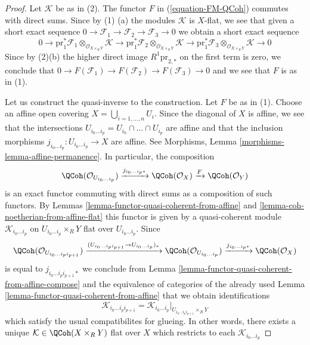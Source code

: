 \begin{proof}
Let $\mathcal{K}$ be as in (2). The functor $F$ in
(\ref{equation-FM-QCoh}) commutes with direct sums.
Since by (1) (a) the modules $\mathcal{K}$ is $X$-flat,
we see that given a short exact
sequence $0 \to \mathcal{F}_1 \to \mathcal{F}_2 \to \mathcal{F}_3 \to 0$
we obtain a short exact sequence
$$
0 \to
\text{pr}_1^*\mathcal{F}_1 \otimes_{\mathcal{O}_{X \times_R Y}} \mathcal{K} \to
\text{pr}_1^*\mathcal{F}_2 \otimes_{\mathcal{O}_{X \times_R Y}} \mathcal{K} \to
\text{pr}_1^*\mathcal{F}_3 \otimes_{\mathcal{O}_{X \times_R Y}} \mathcal{K} \to
0
$$
Since by (2)(b) the higher direct image $R^1\text{pr}_{2, *}$
on the first term is zero, we conclude that
$0 \to F(\mathcal{F}_1) \to F(\mathcal{F}_2) \to F(\mathcal{F}_3) \to 0$
and we see that $F$ is as in (1).

\medskip\noindent
Let us construct the quasi-inverse to the construction. Let $F$ be
as in (1). Choose an affine open covering $X = \bigcup_{i = 1, \ldots, n} U_i$.
Since the diagonal of $X$ is affine, we see that the intersections
$U_{i_0 \ldots i_p} = U_{i_0} \cap \ldots \cap U_{i_p}$ are affine
and that the inclusion morphisms
$j_{i_0 \ldots i_p} : U_{i_0 \ldots i_p} \to X$
are affine. See Morphisms, Lemma \ref{morphisms-lemma-affine-permanence}.
In particular, the composition
$$
\QCoh(\mathcal{O}_{U_{i_0 \ldots i_p}})
\xrightarrow{j_{i_0 \ldots i_p *}}
\QCoh(\mathcal{O}_X) \xrightarrow{F}
\QCoh(\mathcal{O}_Y)
$$
is an exact functor commuting with direct sums as a composition of such
functors. By Lemmas \ref{lemma-functor-quasi-coherent-from-affine} and
\ref{lemma-coh-noetherian-from-affine-flat}
this functor is given by a quasi-coherent module
$\mathcal{K}_{i_0 \ldots i_p}$ on $U_{i_0 \ldots i_p} \times_R Y$
flat over $U_{i_0 \ldots i_p}$. Since
$$
\QCoh(\mathcal{O}_{U_{i_0 \ldots i_p i_{p + 1}}})
\xrightarrow{(U_{i_0 \ldots i_p i_{p + 1}} \to U_{i_0 \ldots i_p})_*}
\QCoh(\mathcal{O}_{U_{i_0 \ldots i_p}})
\xrightarrow{j_{i_0 \ldots i_p *}}
\QCoh(\mathcal{O}_X)
$$
is equal to $j_{i_0 \ldots i_p i_{p + 1} *}$ we conclude from
Lemma \ref{lemma-functor-quasi-coherent-from-affine-compose}
and the equivalence of categories of the already used
Lemma \ref{lemma-functor-quasi-coherent-from-affine}
that we obtain identifications
$$
\mathcal{K}_{i_0 \ldots i_p i_{p + 1}} =
\mathcal{K}_{i_0 \ldots i_p}|_{U_{i_0 \ldots i_p i_{p + 1}} \times_R Y}
$$
which satisfy the usual compatibilites for glueing.
In other words, there exists a unique $\mathcal{K} \in \QCoh(X \times_R Y)$
flat over $X$ which restricts to each $\mathcal{K}_{i_0 \ldots i_p}$

\end{proof}
